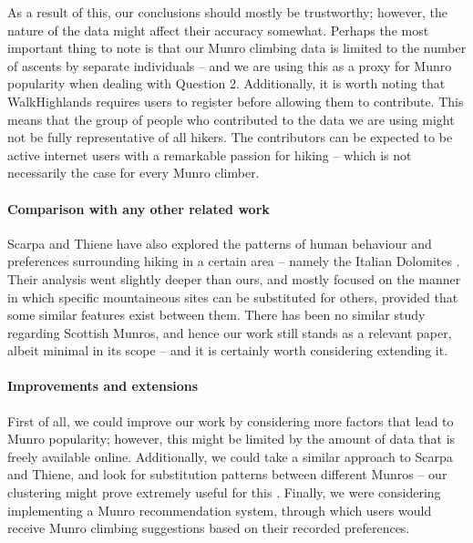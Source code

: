 \documentclass[11pt,a4paper]{article}
\begin{document}
As a result of this, our conclusions should mostly be trustworthy; however, the nature of the data might affect their accuracy somewhat. Perhaps the most important thing to note is that our Munro climbing data is limited to the number of ascents by separate individuals – and we are using this as a proxy for Munro popularity when dealing with Question 2. Additionally, it is worth noting that WalkHighlands requires users to register before allowing them to contribute. This means that the group of people who contributed to the data we are using might not be fully representative of all hikers. The contributors can be expected to be active internet users with a remarkable passion for hiking – which is not necessarily the case for every Munro climber.
\paragraph{Comparison with any other related work}
Scarpa and Thiene have also explored the patterns of human behaviour and preferences surrounding hiking in a certain area – namely the Italian Dolomites \cite{HitA}. Their analysis went slightly deeper than ours, and mostly focused on the manner in which specific mountaineous sites can be substituted for others, provided that some similar features exist between them. There has been no similar study regarding Scottish Munros, and hence our work still stands as a relevant paper, albeit minimal in its scope – and it is certainly worth considering extending it.
\paragraph{Improvements and extensions}
First of all, we could improve our work by considering more factors that lead to Munro popularity; however, this might be limited by the amount of data that is freely available online. Additionally, we could take a similar approach to Scarpa and Thiene, and look for substitution patterns between different Munros – our clustering might prove extremely useful for this \cite{HitA}. Finally, we were considering implementing a Munro recommendation system, through which users would receive Munro climbing suggestions based on their recorded preferences.


\end{document}
